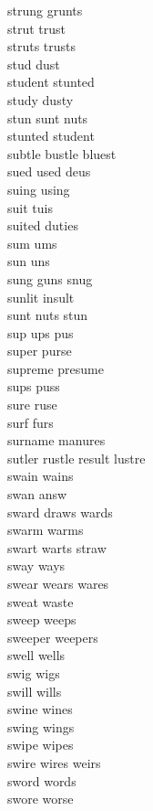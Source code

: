 strung grunts\\
strut trust\\
struts trusts\\
stud dust\\
student stunted\\
study dusty\\
stun sunt nuts\\
stunted student\\
subtle bustle bluest\\
sued used deus\\
suing using\\
suit tuis\\
suited duties\\
sum ums\\
sun uns\\
sung guns snug\\
sunlit insult\\
sunt nuts stun\\
sup ups pus\\
super purse\\
supreme presume\\
sups puss\\
sure ruse\\
surf furs\\
surname manures\\
sutler rustle result lustre\\
swain wains\\
swan answ\\
sward draws wards\\
swarm warms\\
swart warts straw\\
sway ways\\
swear wears wares\\
sweat waste\\
sweep weeps\\
sweeper weepers\\
swell wells\\
swig wigs\\
swill wills\\
swine wines\\
swing wings\\
swipe wipes\\
swire wires weirs\\
sword words\\
swore worse\\


